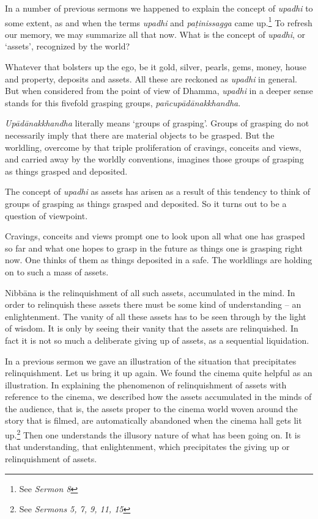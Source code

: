 In a number of previous sermons we happened to explain the concept of \emph{upadhi} to some extent, as and when the terms \emph{upadhi} and \emph{paṭinissagga} came up.\footnote{See \emph{Sermon 8}} To refresh our memory, we may summarize all that now. What is the concept of \emph{upadhi}, or `assets', recognized by the world?

Whatever that bolsters up the ego, be it gold, silver, pearls, gems, money, house and property, deposits and assets. All these are reckoned as \emph{upadhi} in general. But when considered from the point of view of Dhamma, \emph{upadhi} in a deeper sense stands for this fivefold grasping groups, \emph{pañcupādānakkhandha}.

\emph{Upādānakkhandha} literally means `groups of grasping'. Groups of grasping do not necessarily imply that there are material objects to be grasped. But the worldling, overcome by that triple proliferation of cravings, conceits and views, and carried away by the worldly conventions, imagines those groups of grasping as things grasped and deposited.

The concept of \emph{upadhi} as assets has arisen as a result of this tendency to think of groups of grasping as things grasped and deposited. So it turns out to be a question of viewpoint.

Cravings, conceits and views prompt one to look upon all what one has grasped so far and what one hopes to grasp in the future as things one is grasping right now. One thinks of them as things deposited in a safe. The worldlings are holding on to such a mass of assets.

Nibbāna is the relinquishment of all such assets, accumulated in the mind. In order to relinquish these assets there must be some kind of understanding -- an enlightenment. The vanity of all these assets has to be seen through by the light of wisdom. It is only by seeing their vanity that the assets are relinquished. In fact it is not so much a deliberate giving up of assets, as a sequential liquidation.

In a previous sermon we gave an illustration of the situation that precipitates relinquishment. Let us bring it up again. We found the cinema quite helpful as an illustration. In explaining the phenomenon of relinquishment of assets with reference to the cinema, we described how the assets accumulated in the minds of the audience, that is, the assets proper to the cinema world woven around the story that is filmed, are automatically abandoned when the cinema hall gets lit up.\footnote{See \emph{Sermons 5, 7, 9, 11, 15}} Then one understands the illusory nature of what has been going on. It is that understanding, that enlightenment, which precipitates the giving up or relinquishment of assets.

